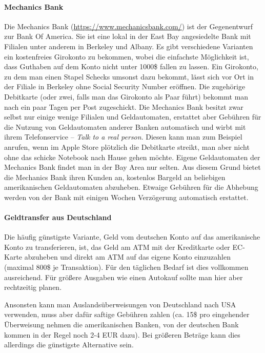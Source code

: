 \documentclass[a4paper]{scrreprt}
\begin{document}

\paragraph{Mechanics Bank}
Die Mechanics Bank (\url{https://www.mechanicsbank.com/}) ist der
Gegenentwurf zur Bank Of America. Sie ist eine lokal in der East Bay
angesiedelte Bank mit Filialen unter anderem in Berkeley und
Albany. Es gibt verschiedene Varianten ein kostenfreies Girokonto zu
bekommen, wobei die einfachste Möglichkeit ist, dass Guthaben auf dem
Konto nicht unter 1000\$ fallen zu lassen. Ein Girokonto, zu dem man
einen Stapel Schecks umsonst dazu bekommt, lässt sich vor Ort in der
Filiale in Berkeley ohne Social Security Number eröffnen. Die
zugehörige Debitkarte (oder zwei, falls man das Girokonto als Paar
führt) bekommt man nach ein paar Tagen per Post zugeschickt. Die
Mechanics Bank besitzt zwar selbst nur einige wenige Filialen und
Geldautomaten, erstattet aber Gebühren für die Nutzung von
Geldautomaten anderer Banken automatisch und wirbt mit ihrem
Telefonservice -- \emph{Talk to a real person}. Diesen kann man zum
Beispiel anrufen, wenn im Apple Store plötzlich die Debitkarte
streikt, man aber nicht ohne das schicke Notebook nach Hause gehen
möchte. Eigene Geldautomaten der Mechanics Bank findet man in der Bay 
Area nur selten. Aus diesem Grund bietet die Mechanics Bank ihren Kunden 
an, kostenlos Bargeld an beliebigen amerikanischen Geldautomaten abzuheben.
Etwaige Gebühren für die Abhebung werden von der Bank mit einigen Wochen 
Verzögerung automatisch erstattet.

\paragraph{Geldtransfer aus Deutschland}

Die häufig günstigste Variante, Geld vom deutschen Konto auf das amerikanische Konto zu transferieren, ist, das Geld am ATM mit der Kreditkarte oder EC-Karte abzuheben und direkt am ATM auf das eigene Konto einzuzahlen (maximal 800\$ je Transaktion). Für den täglichen Bedarf ist dies vollkommen ausreichend. Für größere Ausgaben wie einen Autokauf sollte man hier aber rechtzeitig planen.

Ansonsten kann man Auslandsüberweisungen von Deutschland nach USA verwenden, muss aber dafür saftige Gebühren zahlen (ca. 15\$ pro eingehender Überweisung nehmen die amerikanischen Banken, von der deutschen Bank kommen in der Regel noch 2-4 EUR dazu). Bei größeren Beträge kann dies allerdings die günstigste Alternative sein.
\end{document}
